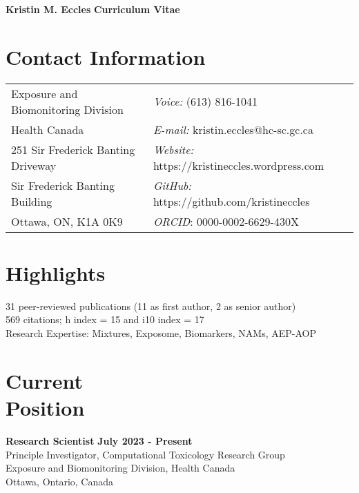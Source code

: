 \documentclass[margin,line]{res}
\begin{document}
\begin{flushleft}
		\huge \textbf{Kristin M. Eccles}
		\hfill {\LARGE \textbf{Curriculum Vitae}}\\
\end{flushleft}

\begin{resume}

\section{\sc Contact Information}
\vspace{.05in}
\begin{tabular}{@{}p{3.2in}p{2.5in}}
Exposure and Biomonitoring Division & {\it Voice:}  (613) 816-1041 \\
Health Canada & {\it E-mail:}  kristin.eccles@hc-sc.gc.ca\\
251 Sir Frederick Banting Driveway&{\it Website:} https://kristineccles.wordpress.com  \\
Sir Frederick Banting Building&{\it GitHub:} https://github.com/kristineccles \\
Ottawa, ON, K1A 0K9 & {\it ORCID}: 0000-0002-6629-430X

\end{tabular}

\vspace*{.1in}
\section{\sc Highlights}
31 peer-reviewed publications (11 as first author, 2 as senior author)
\\
569 citations; h index = 15 and i10 index = 17
\\
Research Expertise: Mixtures, Exposome, Biomarkers, NAMs, AEP-AOP

\vspace*{.1in}
\section{\sc Current\\Position}
{\bf  Research Scientist} \hfill {\bf July 2023 - Present}\\
Principle Investigator, Computational Toxicology Research Group\\
Exposure and Biomonitoring Division, Health Canada\\
Ottawa, Ontario, Canada

\vspace*{.1in}

\end{resume}
\end{document}
